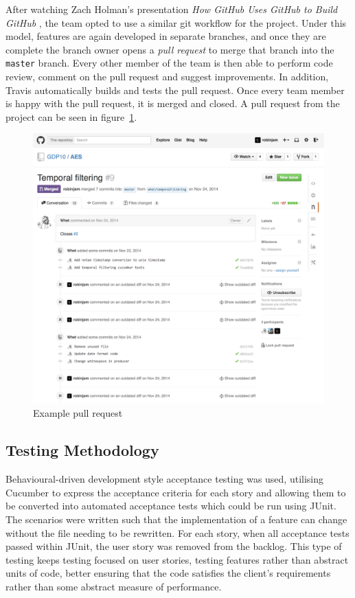 \documentclass[a4paper, 12pt, twoside]{article}
\begin{document}
After watching Zach Holman's presentation \emph{How GitHub Uses GitHub to Build GitHub} \cite{hgugtbg}, the team opted to use a similar git workflow for the project. Under this model, features are again developed in separate branches, and once they are complete the branch owner opens a \emph{pull request} to merge that branch into the \texttt{master} branch. Every other member of the team is then able to perform code review, comment on the pull request and suggest improvements. In addition, Travis automatically builds and tests the pull request. Once every team member is happy with the pull request, it is merged and closed. A pull request from the project can be seen in figure~\ref{fig:pull_request}.

\begin{figure}
  \includegraphics[width=\linewidth]{pull_request.png}
  \caption{Example pull request}
  \label{fig:pull_request}
\end{figure}

\subsection{Testing Methodology}
\label{sec:plan_testing_methodology}

Behavioural-driven development style acceptance testing was used, utilising Cucumber to express the acceptance criteria for each story and allowing them to be converted into automated acceptance tests which could be run using JUnit. The scenarios were written such that the implementation of a feature can change without the file needing to be rewritten. For each story, when all acceptance tests passed within JUnit, the user story was removed from the backlog. This type of testing keeps testing focused on user stories, testing features rather than abstract units of code, better ensuring that the code satisfies the client's requirements rather than some abstract measure of performance.
\end{document}
